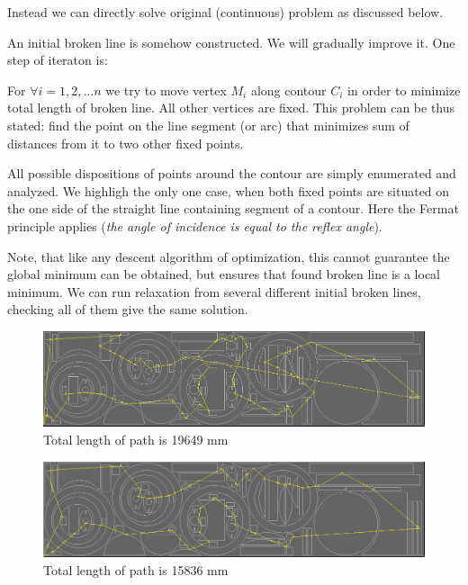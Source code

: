 \documentclass{../download/tPRS2e}
\begin{document}
Instead we can directly solve original
(continuous) problem as discussed below.

An initial broken line is somehow constructed.
We will gradually improve it.
One step of iteraton is:

For $ \forall i = 1, 2, \dots n$ we try to move vertex $M_i$
along contour $C_i$ in order to minimize total length
of broken line. All other vertices are fixed.
This problem can be thus stated:
find the point on the line segment (or arc)
that minimizes sum of distances from it to
two other fixed points.

All possible dispositions of points around the contour
are simply enumerated and analyzed.
We highligh the only one case,
when both fixed points are situated on the one side
of the straight line containing segment of a contour.
Here the Fermat principle applies
(\textit{the angle of incidence is equal to the reflex angle}).

Note, that like any descent algorithm of optimization,
this cannot guarantee
the global minimum can be obtained,
but ensures that found broken line is a local minimum.
We can run relaxation from several different initial broken lines,
checking all of them give the same solution.

\begin{figure}[b]
    \includegraphics{mini-bad.png}
    \caption{Total length of path is 19649 mm}
\end{figure}

\begin{figure}[b]
    \includegraphics{mini-good.png}
    \caption{Total length of path is 15836 mm}
\end{figure}
\end{document}
